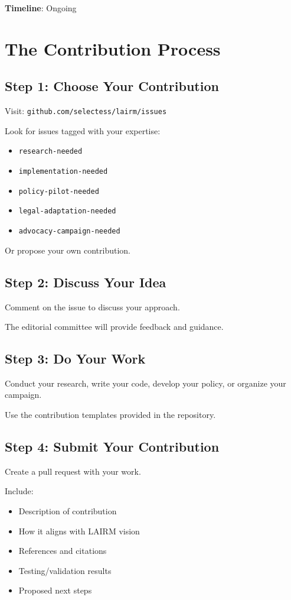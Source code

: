 \documentclass[12pt,a4paper,twoside,openright]{book}
\begin{document}
\textbf{Timeline}: Ongoing

\section{The Contribution Process}

\subsection{Step 1: Choose Your Contribution}

Visit: \texttt{github.com/selectess/lairm/issues}

Look for issues tagged with your expertise:
\begin{itemize}
    \item \texttt{research-needed}
    \item \texttt{implementation-needed}
    \item \texttt{policy-pilot-needed}
    \item \texttt{legal-adaptation-needed}
    \item \texttt{advocacy-campaign-needed}
\end{itemize}

Or propose your own contribution.

\subsection{Step 2: Discuss Your Idea}

Comment on the issue to discuss your approach.

The editorial committee will provide feedback and guidance.

\subsection{Step 3: Do Your Work}

Conduct your research, write your code, develop your policy, or organize your campaign.

Use the contribution templates provided in the repository.

\subsection{Step 4: Submit Your Contribution}

Create a pull request with your work.

Include:
\begin{itemize}
    \item Description of contribution
    \item How it aligns with LAIRM vision
    \item References and citations
    \item Testing/validation results
    \item Proposed next steps
\end{itemize}
\end{document}

